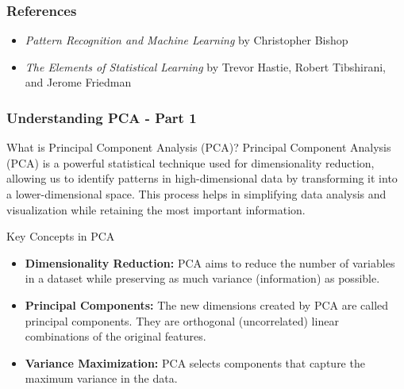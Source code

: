 \documentclass[aspectratio=169]{beamer}
\begin{document}
\begin{frame}[fragile]
    \frametitle{References}
    \begin{itemize}
        \item \textit{Pattern Recognition and Machine Learning} by Christopher Bishop
        \item \textit{The Elements of Statistical Learning} by Trevor Hastie, Robert Tibshirani, and Jerome Friedman
    \end{itemize}
\end{frame}

\begin{frame}[fragile]
    \frametitle{Understanding PCA - Part 1}
    \begin{block}{What is Principal Component Analysis (PCA)?}
        Principal Component Analysis (PCA) is a powerful statistical technique used for dimensionality reduction, allowing us to identify patterns in high-dimensional data by transforming it into a lower-dimensional space. This process helps in simplifying data analysis and visualization while retaining the most important information.
    \end{block}

    \begin{block}{Key Concepts in PCA}
        \begin{itemize}
            \item \textbf{Dimensionality Reduction:} PCA aims to reduce the number of variables in a dataset while preserving as much variance (information) as possible.
            \item \textbf{Principal Components:} The new dimensions created by PCA are called principal components. They are orthogonal (uncorrelated) linear combinations of the original features.
            \item \textbf{Variance Maximization:} PCA selects components that capture the maximum variance in the data.
        \end{itemize}
    \end{block}
\end{frame}
\end{document}

